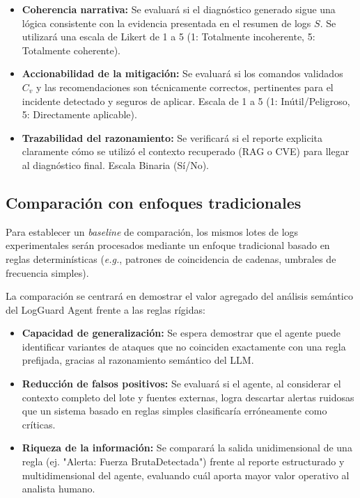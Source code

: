 \begin{itemize}
    \item \textbf{Coherencia narrativa:} Se evaluará si el diagnóstico generado sigue una lógica consistente con la evidencia presentada en el resumen de logs $S$. Se utilizará una escala de Likert de 1 a 5 (1: Totalmente incoherente, 5: Totalmente coherente).
    \item \textbf{Accionabilidad de la mitigación:} Se evaluará si los comandos validados $C_v$ y las recomendaciones son técnicamente correctos, pertinentes para el incidente detectado y seguros de aplicar. Escala de 1 a 5 (1: Inútil/Peligroso, 5: Directamente aplicable).
    \item \textbf{Trazabilidad del razonamiento:} Se verificará si el reporte explicita claramente cómo se utilizó el contexto recuperado (RAG o CVE) para llegar al diagnóstico final. Escala Binaria (Sí/No).
\end{itemize}

\subsection{Comparación con enfoques tradicionales}

Para establecer un \textit{baseline} de comparación, los mismos lotes de logs experimentales serán procesados mediante un enfoque tradicional basado en reglas determinísticas (\textit{e.g.}, patrones de coincidencia de cadenas, umbrales de frecuencia simples).

La comparación se centrará en demostrar el valor agregado del análisis semántico del LogGuard Agent frente a las reglas rígidas:

\begin{itemize}
    \item \textbf{Capacidad de generalización:} Se espera demostrar que el agente puede identificar variantes de ataques que no coinciden exactamente con una regla prefijada, gracias al razonamiento semántico del LLM.
    \item \textbf{Reducción de falsos positivos:} Se evaluará si el agente, al considerar el contexto completo del lote y fuentes externas, logra descartar alertas ruidosas que un sistema basado en reglas simples clasificaría erróneamente como críticas.
    \item \textbf{Riqueza de la información:} Se comparará la salida unidimensional de una regla (ej. "Alerta: Fuerza BrutaDetectada") frente al reporte estructurado y multidimensional del agente, evaluando cuál aporta mayor valor operativo al analista humano.
\end{itemize}


